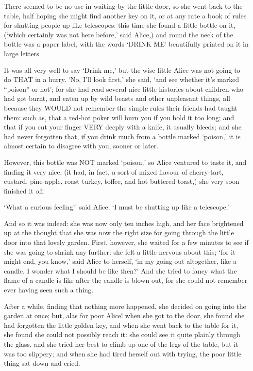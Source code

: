 \documentclass[12pt]{book}
\begin{document}
  There seemed to be no use in waiting by the little door, so she
went back to the table, half hoping she might find another key on
it, or at any rate a book of rules for shutting people up like
telescopes:  this time she found a little bottle on it, (`which
certainly was not here before,' said Alice,) and round the neck
of the bottle was a paper label, with the words `DRINK ME'
beautifully printed on it in large letters.

  It was all very well to say `Drink me,' but the wise little
Alice was not going to do THAT in a hurry.  `No, I'll look
first,' she said, `and see whether it's marked ``poison'' or not';
for she had read several nice little histories about children who
had got burnt, and eaten up by wild beasts and other unpleasant
things, all because they WOULD not remember the simple rules
their friends had taught them:  such as, that a red-hot poker
will burn you if you hold it too long; and that if you cut your
finger VERY deeply with a knife, it usually bleeds; and she had
never forgotten that, if you drink much from a bottle marked
`poison,' it is almost certain to disagree with you, sooner or
later.

  However, this bottle was NOT marked `poison,' so Alice ventured
to taste it, and finding it very nice, (it had, in fact, a sort
of mixed flavour of cherry-tart, custard, pine-apple, roast
turkey, toffee, and hot buttered toast,) she very soon finished
it off.

  `What a curious feeling!' said Alice; `I must be shutting up
like a telescope.'

  And so it was indeed:  she was now only ten inches high, and
her face brightened up at the thought that she was now the right
size for going through the little door into that lovely garden.
First, however, she waited for a few minutes to see if she was
going to shrink any further:  she felt a little nervous about
this; `for it might end, you know,' said Alice to herself, `in my
going out altogether, like a candle.  I wonder what I should be
like then?'  And she tried to fancy what the flame of a candle is
like after the candle is blown out, for she could not remember
ever having seen such a thing.

  After a while, finding that nothing more happened, she decided
on going into the garden at once; but, alas for poor Alice!
when she got to the door, she found she had forgotten the
little golden key, and when she went back to the table for it,
she found she could not possibly reach it:  she could see it
quite plainly through the glass, and she tried her best to climb
up one of the legs of the table, but it was too slippery;
and when she had tired herself out with trying,
the poor little thing sat down and cried.
\end{document}
